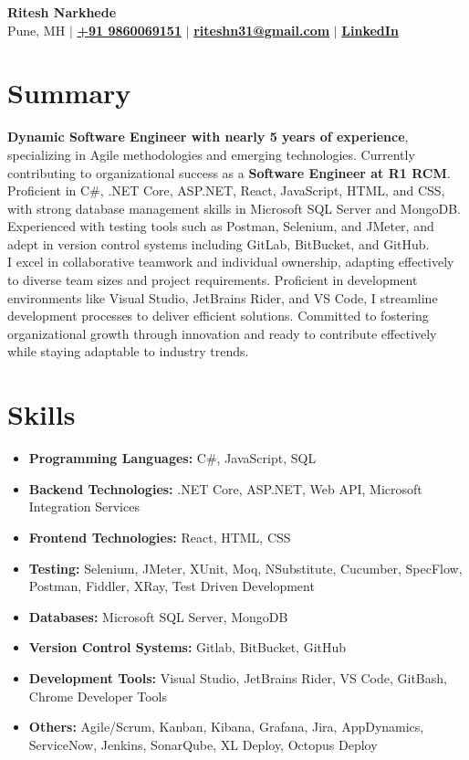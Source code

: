 \documentclass{article}
\begin{document}
\pagestyle{empty}

\begin{center}
    \textbf{\LARGE Ritesh Narkhede}\\
    Pune, MH $\vert$ 
    \href{tel:+919860069151}{\textbf{+91 9860069151}} $\vert$ \href{mailto:riteshn31@gmail.com}{\textbf{riteshn31@gmail.com}} $\vert$ \href{https://www.linkedin.com/in/ritesh-narkhede-79963a108}{\textbf{LinkedIn}}
\end{center}

\section*{Summary}

\noindent
\textbf{Dynamic Software Engineer with nearly 5 years of experience}, specializing in Agile methodologies and emerging technologies. Currently contributing to organizational success as a \textbf{Software Engineer at R1 RCM}. Proficient in C\#, .NET Core, ASP.NET, React, JavaScript, HTML, and CSS, with strong database management skills in Microsoft SQL Server and MongoDB. Experienced with testing tools such as Postman, Selenium, and JMeter, and adept in version control systems including GitLab, BitBucket, and GitHub.
\medskip\\
\noindent
I excel in collaborative teamwork and individual ownership, adapting effectively to diverse team sizes and project requirements. Proficient in development environments like Visual Studio, JetBrains Rider, and VS Code, I streamline development processes to deliver efficient solutions. Committed to fostering organizational growth through innovation and ready to contribute effectively while staying adaptable to industry trends.

\section*{Skills}
\begin{itemize}[label=]
	\item \textbf{Programming Languages:} C\#, JavaScript, SQL
	\item \textbf{Backend Technologies:} .NET Core, ASP.NET, Web API, Microsoft Integration Services 
	\item \textbf{Frontend Technologies:} React, HTML, CSS 
	\item \textbf{Testing:} Selenium, JMeter, XUnit, Moq, NSubstitute, Cucumber, SpecFlow, Postman, Fiddler, XRay, Test Driven Development 
	\item \textbf{Databases:} Microsoft SQL Server, MongoDB 
	\item \textbf{Version Control Systems:} Gitlab, BitBucket, GitHub 
	\item \textbf{Development Tools:} Visual Studio, JetBrains Rider, VS Code, GitBash, Chrome Developer Tools 
	\item \textbf{Others:} Agile/Scrum, Kanban, Kibana, Grafana, Jira, AppDynamics, ServiceNow, Jenkins, SonarQube, XL Deploy, Octopus Deploy
\end{itemize}
\end{document}
